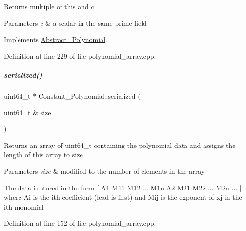\begin{DoxyReturn}{Returns}
multiple of {\ttfamily this} and {\ttfamily c} 
\end{DoxyReturn}

\begin{DoxyParams}{Parameters}
{\em c} & a scalar in the same prime field \\
\hline
\end{DoxyParams}


Implements \hyperlink{group__polygroup_a53b0ed425ff4bbbf01818005d6003d59}{Abstract\+\_\+\+Polynomial}.



Definition at line 229 of file polynomial\+\_\+array.\+cpp.

\mbox{\label{group__polygroup_aafc581313f33e812add8db45cfaa1492}} 
\subparagraph{\texorpdfstring{serialized()}{serialized()}}
{\footnotesize\ttfamily uint64\+\_\+t $\ast$ Constant\+\_\+\+Polynomial\+::serialized (\begin{DoxyParamCaption}\item[{uint64\+\_\+t \&}]{size }\end{DoxyParamCaption})}

\begin{DoxyReturn}{Returns}
an array of {\ttfamily uint64\+\_\+t} containing the polynomial data and assigns the length of this array to {\ttfamily size} 
\end{DoxyReturn}

\begin{DoxyParams}{Parameters}
{\em size} & modified to the number of elements in the array\\
\hline
\end{DoxyParams}
The data is stored in the form \mbox{[} A1 M11 M12 ... M1n A2 M21 M22 ... M2n ... \mbox{]} where Ai is the ith coefficient (lead is first) and Mij is the exponent of xj in the ith monomial 

Definition at line 152 of file polynomial\+\_\+array.\+cpp.

